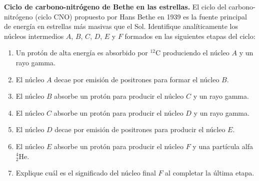 \item \textbf{Ciclo de carbono-nitrógeno de Bethe en las estrellas.}
El ciclo del carbono-nitrógeno (ciclo CNO) propuesto por Hans Bethe en 1939 es la fuente principal de energía en estrellas más masivas que el Sol. Identifique analíticamente los núcleos intermedios $A$, $B$, $C$, $D$, $E$ y $F$ formados en las siguientes etapas del ciclo:
\begin{enumerate}
    \item Un protón de alta energía es absorbido por $^{12}\text{C}$ produciendo el núcleo $A$ y un rayo gamma.
    \item El núcleo $A$ decae por emisión de positrones para formar el núcleo $B$.
    \item El núcleo $B$ absorbe un protón para producir el núcleo $C$ y un rayo gamma.
    \item El núcleo $C$ absorbe un protón para producir el núcleo $D$ y un rayo gamma.
    \item El núcleo $D$ decae por emisión de positrones para producir el núcleo $E$.
    \item El núcleo $E$ absorbe un protón para producir el núcleo $F$ y una partícula alfa $^{4}_{2}\text{He}$.
    \item Explique cuál es el significado del núcleo final $F$ al completar la última etapa.
\end{enumerate}